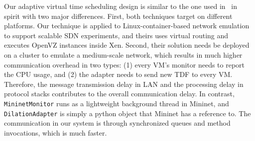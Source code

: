 
Our adaptive virtual time scheduling design is similar to the one used in~\cite{NtwkEmultAdaptVirtTime} in spirit with two major differences. 
First, both techniques target on different platforms. 
Our technique is applied to Linux-container-based network emulation to support scalable SDN experiments,
and theirs uses virtual routing and executes OpenVZ instances inside Xen. 
Second, their solution needs be deployed on a cluster to emulate a medium-scale network, which results in much higher communication overhead in two types:
(1) every VM's monitor needs to report the CPU usage, and
(2) the adapter needs to send new TDF to every VM. 
Therefore, the message transmission delay in LAN and the processing delay in protocol stacks contributes to the overall communication delay. 
In contrast, \texttt{MininetMonitor} runs as a lightweight background thread in Mininet,
and \texttt{DilationAdapter} is simply a python object that Mininet has a reference to. 
The communication in our system is through synchronized queues and method invocations, which is much faster. 


